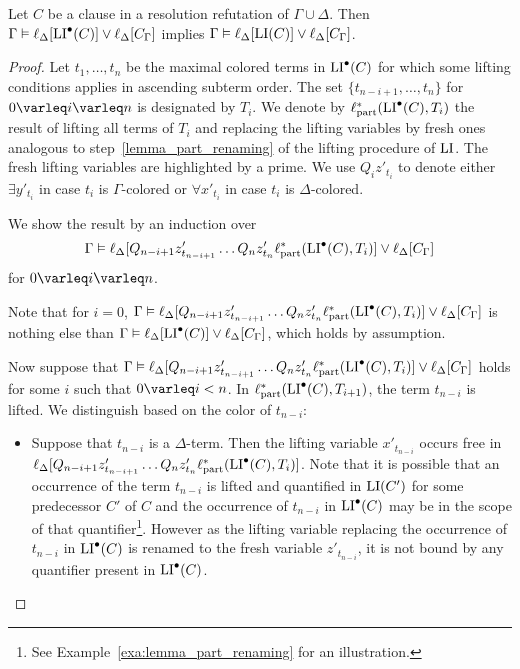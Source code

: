 \begin{lemma}
	\label{lemma:lipre_implies_li}
	Let $C$ be a clause in a resolution refutation of $\Gamma \cup \Delta$.
	Then
	$\Gamma \vDash \ell_{\Delta}[ \operatorname{LI}^\bullet(C) ] \lor \ell_{\Delta}[C_\Gamma]$
	implies 
	$\Gamma \vDash \ell_{\Delta}[ \operatorname{LI}(C) ] \lor \ell_{\Delta}[C_\Gamma]$.
\end{lemma}
\begin{proof}
	Let $t_1, \dots, t_n$ be the maximal colored terms in $\operatorname{LI}^\bullet(C)$ for which some lifting conditions applies in ascending subterm order. The set $\{t_{n-i+1}, \dots, t_n \}$  for $0\varleq i \varleq n$ is designated by $T_i$.
	We denote by $\ell_\mathrm{part}^*(\operatorname{LI}^\bullet(C), T_i)$ the result of lifting all terms of $T_i$ and replacing the lifting variables by fresh ones analogous to step~\ref{lemma_part_renaming} of the lifting procedure of $\operatorname{LI}$.
	The fresh lifting variables are highlighted by a prime.
	We use $Q_i z'_{t_i}$ to denote either $\exists y'_{t_i}$ in case $t_i$ is $\Gamma$-colored or $\forall x'_{t_i}$ in case $t_i$ is $\Delta$-colored.

	We show the result by an induction over \[\Gamma \vDash \ell_{\Delta}[ Q_{n-i+1} z'_{t_{n-i+1}} \dots Q_n z'_{t_n} \ell_\mathrm{part}^*( \operatorname{LI}^\bullet(C), T_i )] \lor \ell_{\Delta}[C_\Gamma]\] for $ 0 \varleq i\varleq n$.

	Note that for $i=0$, 
	$\Gamma \vDash \ell_{\Delta}[ Q_{n-i+1} z'_{t_{n-i+1}} \dots Q_n z'_{t_n} \ell_\mathrm{part}^*( \operatorname{LI}^\bullet(C), T_i )] \lor \ell_{\Delta}[C_\Gamma]$ is nothing else than $\Gamma \vDash \ell_{\Delta}[\operatorname{LI}^\bullet(C)] \lor \ell_{\Delta}[C_\Gamma]$, which holds by assumption.

	Now suppose that $\Gamma \vDash \ell_{\Delta}[ Q_{n-i+1} z'_{t_{n-i+1}} \dots Q_n z'_{t_n} \ell_\mathrm{part}^*( \operatorname{LI}^\bullet(C), T_i )] \lor \ell_{\Delta}[C_\Gamma]$ holds for some $i$ such that $0\varleq i < n$.
	In $\ell_\mathrm{part}^*( \operatorname{LI}^\bullet(C), T_{i+1} )$, the term $t_{n-i}$ is lifted.
	We distinguish based on the color of $t_{n-i}$:
	\begin{itemize}
		\item
			Suppose that $t_{n-i}$ is a $\Delta$-term.
			Then the lifting variable $x'_{t_{n-i}}$ occurs free in $\ell_{\Delta}[ Q_{n-i+1} z'_{t_{n-i+1}} \dots Q_n z'_{t_n} \ell_\mathrm{part}^*( \operatorname{LI}^\bullet(C), T_i )]$.
			Note that it is possible that an occurrence of the term $t_{n-i}$ is lifted and quantified in $\operatorname{LI}(C')$ for some predecessor $C'$ of $C$ and the occurrence of $t_{n-i}$ in $\operatorname{LI}^\bullet(C)$ may be in the scope of that quantifier\footnote{See Example~\ref{exa:lemma_part_renaming} for an illustration.}. 
			However as the lifting variable replacing the occurrence of $t_{n-i}$ in $\operatorname{LI}^\bullet(C)$ is renamed to the fresh variable $z'_{t_{n-i}}$, it is not bound by any quantifier present in $\operatorname{LI}^\bullet(C)$.



\end{itemize}
\end{proof}
